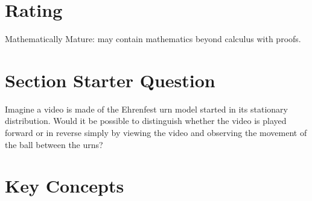 \documentclass[12pt]{article}
\begin{document}
\myheader \mytitle

\hr


\hr

\usefirefox



\hr

\section*{Rating} %
Mathematically Mature:  may contain mathematics beyond calculus with
proofs. %

\hr

\section*{Section Starter Question}

Imagine a video is made of the Ehrenfest urn model started in its
stationary distribution.  Would it be possible to distinguish whether
the video is played forward or in reverse simply by viewing the video
and observing the movement of the ball between the urns?

\hr

\section*{Key Concepts}
\end{document}
